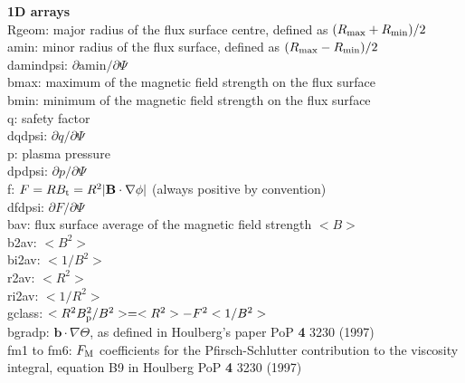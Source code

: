 \documentclass[a4paper,12pt]{article}
\newcommand{\ind}[1]{\ensuremath{_{\rm{#1}}}}
\begin{document}
\textbf{1D arrays}\\
Rgeom: major radius of the flux surface centre, defined as $(R\ind{max}+R\ind{min})/2$\\
amin: minor radius of the flux surface, defined as $(R\ind{max}-R\ind{min})/2$\\
damindpsi: $\partial \mathrm{amin}/\partial \Psi$\\
bmax: maximum of the magnetic field strength on the flux surface\\
bmin: minimum of the magnetic field strength on the flux surface\\
q: safety factor\\
dqdpsi: $\partial q /\partial \Psi$\\
p: plasma pressure\\
dpdpsi: $\partial p /\partial \Psi$\\
f: $F=RB\ind{t} = R^2|\mathbf{B}\cdot\nabla\phi|$ (always positive by convention)\\
dfdpsi: $\partial F /\partial \Psi$\\
bav: flux surface average of the magnetic field strength $< B >$\\
b2av: $< B^2 >$\\
bi2av: $< 1/B^2 >$\\
r2av: $< R^2 >$\\
ri2av: $< 1/R^2 >$\\
gclass: $< R^2B\ind{p}^2/B^2 > = <R^2>-F^2<1/B^2>$\\
bgradp: $\mathbf{b}\cdot\nabla \Theta$, as defined in Houlberg's paper PoP \textbf{4} 3230 (1997)\\
fm1 to fm6: $F\ind{M}$ coefficients for the Pfirsch-Schlutter contribution to the viscosity integral, equation B9 in Houlberg PoP \textbf{4} 3230 (1997)
\end{document}
